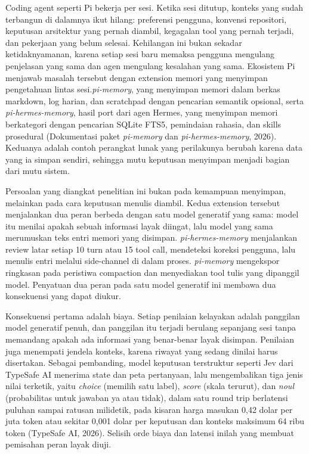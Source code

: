 \documentclass[
]{article}
\begin{document}
Coding agent seperti Pi bekerja per sesi. Ketika sesi ditutup, konteks
yang sudah terbangun di dalamnya ikut hilang: preferensi pengguna,
konvensi repositori, keputusan arsitektur yang pernah diambil, kegagalan
tool yang pernah terjadi, dan pekerjaan yang belum selesai. Kehilangan
ini bukan sekadar ketidaknyamanan, karena setiap sesi baru memaksa
pengguna mengulang penjelasan yang sama dan agen mengulang kesalahan
yang sama. Ekosistem Pi menjawab masalah tersebut dengan extension
memori yang menyimpan pengetahuan lintas sesi.\emph{pi-memory}, yang
menyimpan memori dalam berkas markdown, log harian, dan scratchpad
dengan pencarian semantik opsional, serta \emph{pi-hermes-memory}, hasil
port dari agen Hermes, yang menyimpan memori berkategori dengan
pencarian SQLite FTS5, pemindaian rahasia, dan skills prosedural
(Dokumentasi paket \emph{pi-memory} dan \emph{pi-hermes-memory}, 2026).
Keduanya adalah contoh perangkat lunak yang perilakunya berubah karena
data yang ia simpan sendiri, sehingga mutu keputusan menyimpan menjadi
bagian dari mutu sistem.

Persoalan yang diangkat penelitian ini bukan pada kemampuan menyimpan,
melainkan pada cara keputusan menulis diambil. Kedua extension tersebut
menjalankan dua peran berbeda dengan satu model generatif yang sama:
model itu menilai apakah sebuah informasi layak diingat, lalu model yang
sama merumuskan teks entri memori yang disimpan. \emph{pi-hermes-memory}
menjalankan review latar setiap 10 turn atau 15 tool call, mendeteksi
koreksi pengguna, lalu menulis entri melalui side-channel di dalam
proses. \emph{pi-memory} mengekspor ringkasan pada peristiwa compaction
dan menyediakan tool tulis yang dipanggil model. Penyatuan dua peran
pada satu model generatif ini membawa dua konsekuensi yang dapat diukur.

Konsekuensi pertama adalah biaya. Setiap penilaian kelayakan adalah
panggilan model generatif penuh, dan panggilan itu terjadi berulang
sepanjang sesi tanpa memandang apakah ada informasi yang benar-benar
layak disimpan. Penilaian juga menempati jendela konteks, karena riwayat
yang sedang dinilai harus disertakan. Sebagai pembanding, model
keputusan terstruktur seperti Jev dari TypeSafe AI menerima state dan
peta pertanyaan, lalu mengembalikan tiga jenis nilai terketik, yaitu
\emph{choice} (memilih satu label), \emph{score} (skala terurut), dan
\emph{noul} (probabilitas untuk jawaban ya atau tidak), dalam satu round
trip berlatensi puluhan sampai ratusan milidetik, pada kisaran harga
masukan 0,42 dolar per juta token atau sekitar 0,001 dolar per keputusan
dan konteks maksimum 64 ribu token (TypeSafe AI, 2026). Selisih orde
biaya dan latensi inilah yang membuat pemisahan peran layak diuji.
\end{document}
